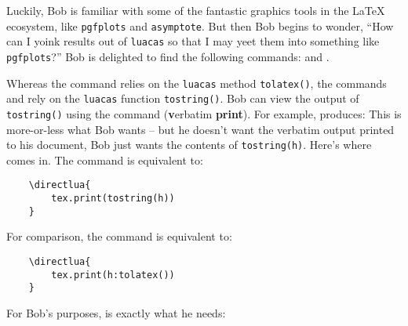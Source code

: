 \documentclass{article}
\begin{document}
Luckily, Bob is familiar with some of the fantastic graphics tools in the \LaTeX{} ecosystem, like \texttt{pgfplots} and \texttt{asymptote}. But then Bob begins to wonder, ``How can I yoink results out of \texttt{luacas} so that I may yeet them into something like \texttt{pgfplots}?''
Bob is delighted to find the following commands: \texttt{\fetch} and \texttt{\store}.

Whereas the \texttt{\print} command relies on the \texttt{luacas} method \texttt{tolatex()}, the commands \texttt{\fetch} and \texttt{\store} rely on the \texttt{luacas} function \texttt{tostring()}. Bob can view the output of \texttt{tostring()} using the \texttt{\vprint} command ({\bf v}erbatim {\bf print}). For example, \texttt{} produces:
This is more-or-less what Bob wants -- but he doesn't want the verbatim output printed to his document, Bob just wants the contents of \texttt{tostring(h)}. Here's where \texttt{\fetch} comes in. The command \texttt{} is equivalent to:
\begin{verbatim}
    \directlua{
        tex.print(tostring(h))
    }
\end{verbatim}
For comparison, the command \texttt{} is equivalent to:
\begin{verbatim}
    \directlua{
        tex.print(h:tolatex())
    }
\end{verbatim}
For Bob's purposes, \texttt{} is exactly what he needs:
\end{document}
